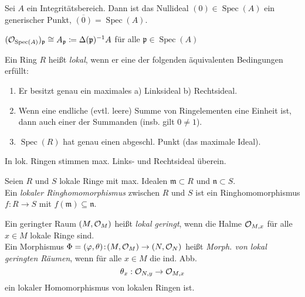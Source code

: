 \documentclass{cheat-sheet}
\DeclareMathOperator{\Spec}{Spec} %
\newcommand{\clos}[1]{\overline{#1}} %
\begin{document}
\begin{bem}
  Sei $A$ ein Integritätsbereich. Dann ist das Nullideal $(0) \in \Spec(A)$ ein generischer Punkt, \dh{} $\clos{(0)} = \Spec(A)$.
\end{bem}

\begin{lem}
  $(\O_{\Spec(A)})_{\mathfrak{p}} \cong A_{\mathfrak{p}} \coloneqq \Delta(\mathfrak{p})^{-1} A$ für alle $\mathfrak{p} \in \Spec(A)$
\end{lem}


\begin{defn}
  Ein Ring $R$ heißt \emph{lokal}, wenn er eine der folgenden äquivalenten Bedingungen erfüllt:
  \begin{enumerate}
    \item Er besitzt genau ein maximales \enspace a) Linksideal \enspace b) Rechtsideal.
    \item Wenn eine endliche (evtl. leere) Summe von Ringelementen eine Einheit ist, dann auch einer der Summanden (insb. gilt $0 \not= 1$).
    \item $\Spec(R)$ hat genau einen abgeschl. Punkt (das maximale Ideal).
  \end{enumerate}
\end{defn}

\begin{bem}
  In lok. Ringen stimmen max. Links- und Rechtsideal überein.
\end{bem}

\begin{defn}
  Seien $R$ und $S$ lokale Ringe mit max. Idealen $\mathfrak{m} \!\subset\! R$ und $\mathfrak{n} \!\subset\! S$. \\
  Ein \emph{lokaler Ringhomomorphismus} zwischen $R$ und $S$ ist ein Ringhomomorphismus $f : R \to S$ mit $f(\mathfrak{m}) \subseteq \mathfrak{n}$.
\end{defn}

\begin{defn}
  Ein geringter Raum $(M, \mathcal{O}_M)$ heißt \emph{lokal geringt}, wenn die Halme $\mathcal{O}_{M,x}$ für alle $x \in M$ lokale Ringe sind. \\
  Ein Morphismus $\Phi = (\varphi, \theta) \!:\! (M, \mathcal{O}_M) \to (N, \mathcal{O}_N)$ heißt \emph{Morph. von lokal geringten Räumen}, wenn für alle $x \in M$ die ind. Abb.
  \[ \theta_x : \mathcal{O}_{N,y} \to \mathcal{O}_{M,x} \]
  ein lokaler Homomorphismus von lokalen Ringen ist.
\end{defn}
\end{document}
